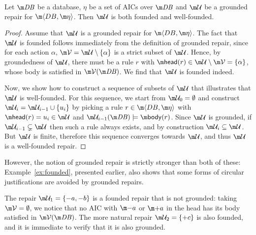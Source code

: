 \begin{proposition}
  \label{prop:founded}
  Let $\db$ be a database, $\eta$ be a set of AICs over $\db$ and $\UU$ be a grounded repair for $\fulldb$.
  Then $\UU$ is both founded and well-founded.
\end{proposition}
\begin{proof}
  Assume that $\UU$ is a grounded repair for $\fulldb$.
  The fact that $\UU$ is founded follows immediately from the definition of grounded repair, since for each action $\alpha$, $\VV=\UU\setminus\{\alpha\}$ is a strict subset of $\UU$. Hence, by groundedness of $\UU$, there must be a rule $r$ with $\head(r)\in \UU\setminus \VV=\{\alpha\}$, whose body is satisfied in $\VV(\db)$. We find that $\UU$ is founded indeed. %
  
  Now, we show how to construct a sequence of subsets of $\UU$ that illustrates that $\UU$ is well-founded. 
  For this sequence, we start from $\UU_0=\emptyset$ and construct $\UU_i=\UU_{i-1}\cup\{u_i\}$ by picking a rule $r\in \fulldb$ with $\head(r)=u_i\in\UU$ and $\UU_{i-1}(\db)\models \body(r)$.
  Since $\UU$ is grounded, if $\UU_{i-1}\subsetneq\UU$ then such a rule always exists,
  and by construction $\UU_i\subseteq\UU$.
  But $\UU$ is finite, therefore this sequence converges towards $\UU$, and thus $\UU$ is a well-founded repair.
\end{proof}

However, the notion of grounded repair is strictly stronger than both of these: Example~\ref{ex:founded}, presented earlier, also shows that some forms of circular justifications are avoided by grounded repairs.
\begin{example}
  \label{ex:founded-gr}
  The repair $\UU_1=\{-a,-b\}$ is a founded repair that is not grounded: taking
  $\VV=\emptyset$, we notice that no AIC with $\remove a$ or $\add a$ in the head has its body satisfied in $\VV(\db)$. %
  The more natural repair $\UU_2=\{+c\}$ is also founded, and it is immediate to verify that it is also grounded.
\end{example}



